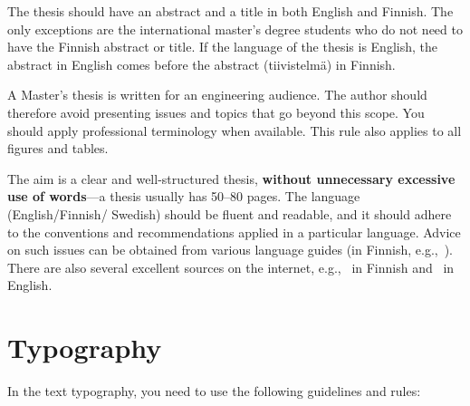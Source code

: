 The thesis should have an abstract and a title in both English and
Finnish. The only exceptions are the international master’s degree
students who do not need to have the Finnish abstract or title. If
the language of the thesis is English, the abstract in English comes
before the abstract (tiivistelmä) in Finnish.

A Master’s thesis is written for an engineering audience. The author
should therefore avoid presenting issues and topics that go beyond
this scope. You should apply professional terminology when available.
This rule also applies to all figures and tables.

The aim is a clear and well-structured thesis, \textbf{without
unnecessary excessive use of words}---a thesis usually has 50--80
pages. The language (English/Finnish/ Swedish) should be fluent and
readable, and it should adhere to the conventions and recommendations
applied in a particular language. Advice on such issues can be
obtained from various language guides (in Finnish,
e.g.,~\cite{maamies}). There are also several excellent sources on
the internet, e.g.,~\cite{korpela, kielitoimisto} in Finnish
and~\cite{reportwriting, englishlanguage} in English.

\section{Typography}

In the text typography, you need to use the following guidelines and rules:


